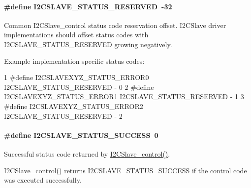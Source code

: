 \paragraph[{I2\+C\+S\+L\+A\+V\+E\+\_\+\+S\+T\+A\+T\+U\+S\+\_\+\+R\+E\+S\+E\+R\+V\+E\+D}]{\setlength{\rightskip}{0pt plus 5cm}\#define I2\+C\+S\+L\+A\+V\+E\+\_\+\+S\+T\+A\+T\+U\+S\+\_\+\+R\+E\+S\+E\+R\+V\+E\+D~-\/32}\label{_i2_c_slave_8h_a9fe1fa8f941643c68c443fc089fadf3c}
Common I2\+C\+Slave\+\_\+control status code reservation offset. I2\+C\+Slave driver implementations should offset status codes with I2\+C\+S\+L\+A\+V\+E\+\_\+\+S\+T\+A\+T\+U\+S\+\_\+\+R\+E\+S\+E\+R\+V\+E\+D growing negatively.

Example implementation specific status codes\+: 
\begin{DoxyCode}
1 #define I2CSLAVEXYZ\_STATUS\_ERROR0     I2CSLAVE\_STATUS\_RESERVED - 0
2 #define I2CSLAVEXYZ\_STATUS\_ERROR1     I2CSLAVE\_STATUS\_RESERVED - 1
3 #define I2CSLAVEXYZ\_STATUS\_ERROR2     I2CSLAVE\_STATUS\_RESERVED - 2
\end{DoxyCode}
\paragraph[{I2\+C\+S\+L\+A\+V\+E\+\_\+\+S\+T\+A\+T\+U\+S\+\_\+\+S\+U\+C\+C\+E\+S\+S}]{\setlength{\rightskip}{0pt plus 5cm}\#define I2\+C\+S\+L\+A\+V\+E\+\_\+\+S\+T\+A\+T\+U\+S\+\_\+\+S\+U\+C\+C\+E\+S\+S~0}\label{_i2_c_slave_8h_a5fefb558e9268fd792ec49f80b697474}


Successful status code returned by \hyperlink{_i2_c_slave_8h_abcd38688f29738ee33b1748a42a3b140}{I2\+C\+Slave\+\_\+control()}. 

\hyperlink{_i2_c_slave_8h_abcd38688f29738ee33b1748a42a3b140}{I2\+C\+Slave\+\_\+control()} returns I2\+C\+S\+L\+A\+V\+E\+\_\+\+S\+T\+A\+T\+U\+S\+\_\+\+S\+U\+C\+C\+E\+S\+S if the control code was executed successfully. 
